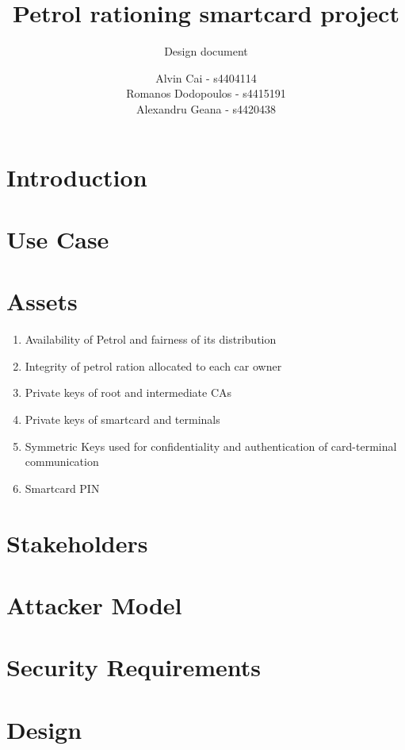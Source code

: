 \documentclass[a4paper,10pt]{llncs}
\title{Petrol rationing smartcard project}
\subtitle{Design document}
\author{Alvin Cai - s4404114 \\ Romanos Dodopoulos - s4415191 \\ Alexandru Geana - s4420438}
\institute{}
\begin{document}
\maketitle

\section{Introduction}


\section{Use Case}


\section{Assets}

\begin{enumerate}
  \item Availability of Petrol and fairness of its distribution
  \item Integrity of petrol ration allocated to each car owner
  \item Private keys of root and intermediate CAs
  \item Private keys of smartcard and terminals
  \item Symmetric Keys used for confidentiality and authentication of card-terminal communication
  \item Smartcard PIN 
\end{enumerate}

\section{Stakeholders}


\section{Attacker Model}


\section{Security Requirements}


\section{Design}
\end{document}
